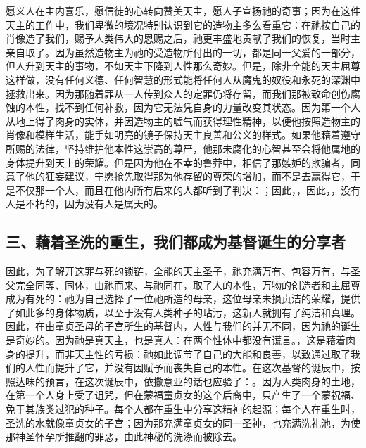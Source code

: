 愿义人在主内喜乐，愿信徒的心转向赞美天主，愿人子宣扬祂的奇事；因为在这件天主的工作中，我们卑微的境况特别认识到它的造物主多么看重它：在祂按自己的肖像造了我们，赐予人类伟大的恩赐之后，祂更丰盛地贡献了我们的恢复，当时主亲自取了。因为虽然造物主为祂的受造物所付出的一切，都是同一父爱的一部分，但人升到天主的事物，不如天主下降到人性那么奇妙。但是，除非全能的天主屈尊这样做，没有任何义德、任何智慧的形式能将任何人从魔鬼的奴役和永死的深渊中拯救出来。因为那随着罪从一人传到众人的定罪仍将存留，而我们那被致命创伤腐蚀的本性，找不到任何补救，因为它无法凭自身的力量改变其状态。因为第一个人从地上得了肉身的实体，并因造物主的嘘气而获得理性精神，以便他按照造物主的肖像和模样生活，能手如明亮的镜子保持天主良善和公义的样式。如果他藉着遵守所赐的法律，坚持维护他本性这崇高的尊严，他那未腐化的心智甚至会将他属地的身体提升到天上的荣耀。但是因为他在不幸的鲁莽中，相信了那嫉妒的欺骗者，同意了他的狂妄建议，宁愿抢先取得那为他存留的尊荣的增加，而不是去赢得它，于是不仅那一个人，而且在他内所有后来的人都听到了判决：；因此，，因此，，没有人是不朽的，因为没有人是属天的。\par


\subsection{三、藉着圣洗的重生，我们都成为基督诞生的分享者}

因此，为了解开这罪与死的锁链，全能的天主圣子，祂充满万有、包容万有，与圣父完全同等、同体，由祂而来、与祂同在，取了人的本性，万物的创造者和主屈尊成为有死的：祂为自己选择了一位祂所造的母亲，这位母亲未损贞洁的荣耀，提供了如此多的身体物质，以至于没有人类种子的玷污，这新人就拥有了纯洁和真理。因此，在由童贞圣母的子宫所生的基督内，人性与我们的并无不同，因为祂的诞生是奇妙的。因为祂是真天主，也是真人：在两个性体中都没有谎言。，这是藉着肉身的提升，而非天主性的亏损：祂如此调节了自己的大能和良善，以致通过取了我们的人性而提升了它，并没有因赋予而丧失自己的本性。在这次基督的诞辰中，按照达味的预言，在这次诞辰中，依撒意亚的话也应验了：。因为人类肉身的土地，在第一个人身上受了诅咒，但在蒙福童贞女的这个后裔中，只产生了一个蒙祝福、免于其族类过犯的种子。每个人都在重生中分享这精神的起源；每个人在重生时，圣洗的水就像童贞女的子宫；因为那充满童贞女的同一圣神，也充满洗礼池，为使那神圣怀孕所推翻的罪恶，由此神秘的洗涤而被除去。\par

